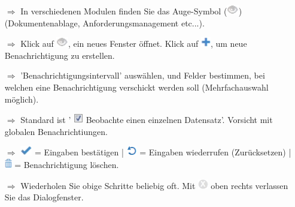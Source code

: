 \documentclass{article}
\begin{document}
\begin{multicols}{2}

\begin{tcolorbox}[colback=blue!5,colframe=blue!40!black,title=Benachrichtigungen einrichten]
\begin{itemize}
  \item[$\Longrightarrow$] In verschiedenen Modulen finden Sie das Auge-Symbol (\includegraphics[height=12pt]{Icons/Auge_g.png}) (Dokumentenablage, Anforderungsmanagement etc...).
  \item[$\Longrightarrow$] Klick auf \includegraphics[height=12pt]{Icons/Auge_g.png}, ein neues Fenster öffnet. Klick auf \includegraphics[height=12pt]{Icons/Pluszeichen.png}, um neue Benachrichtigung zu erstellen.
  \item[$\Longrightarrow$] 'Benachrichtigungsintervall' auswählen, und Felder bestimmen, bei welchen eine Benachrichtigung verschickt werden soll (Mehrfachauswahl möglich).
	\item[$\Longrightarrow$] Standard ist ' \includegraphics[height=12pt]{Icons/checkbox_markiert.png} Beobachte einen einzelnen Datensatz'. Vorsicht mit globalen Benachrichtiungen.
  \item[$\Longrightarrow$] \includegraphics[height=12pt]{Icons/Gutzeichen.png} = Eingaben bestätigen | \includegraphics[height=12pt]{Icons/Refresh.png} = Eingaben wiederrufen (Zurücksetzen) | \includegraphics[height=12pt]{Icons/Muelltonne.png} = Benachrichtigung löschen.
  \item[$\Longrightarrow$] Wiederholen Sie obige Schritte beliebig oft. Mit \includegraphics[height=12pt]{Icons/X_Button.png} oben rechts verlassen Sie das Dialogfenster.
\end{itemize}
\end{tcolorbox}



\end{multicols}
\end{document}

